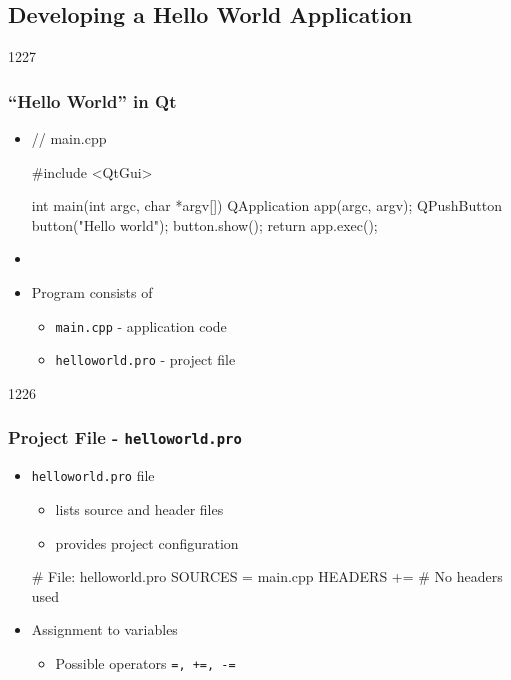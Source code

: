 %
%
%
%

\subsection{Developing a Hello World Application}

\begin{slide}[fragile]{1227}
  \frametitle{``Hello World'' in Qt}
  \medskip
  \begin{itemize}
  \item [] \begin{cpp}
// main.cpp

#include <QtGui>

int main(int argc, char *argv[])
{
  QApplication app(argc, argv);
  QPushButton button("Hello world");
  button.show();
  return app.exec();
}
  \end{cpp}
 \item[]
 \item Program consists of
    \begin{itemize}
    \item \texttt{main.cpp} - application code
    \item \texttt{helloworld.pro} - project file
    \end{itemize}
  \end{itemize}
\end{slide}

\begin{slide}[fragile]{1226}
\frametitle{Project File - \texttt{helloworld.pro}}
\begin{itemize}
\item \texttt{helloworld.pro} file
  \begin{itemize}
  \item lists source and header files
  \item provides project configuration
 \end{itemize}
\begin{qmake}
# File: helloworld.pro
SOURCES  = main.cpp
HEADERS +=          # No headers used
\end{qmake}
\item Assignment to variables
  \begin{itemize}
  \item Possible operators \texttt{=, +=, -=}
  \end{itemize}
\end{itemize}
\end{slide}

